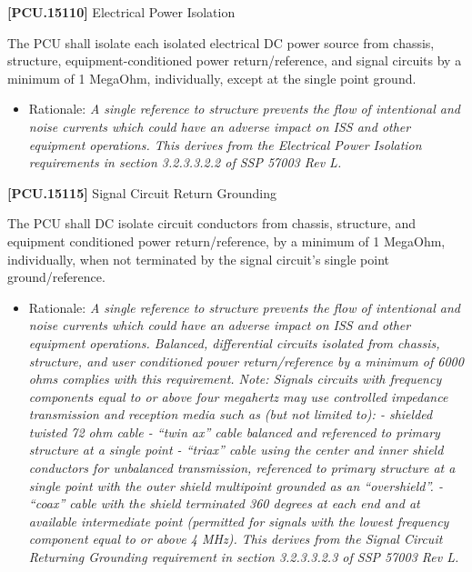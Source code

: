 \textbf{[PCU.15110]} Electrical Power Isolation

The \gls{PCU} shall isolate each isolated electrical DC power source from chassis, structure, equipment-conditioned power return\slash reference, and signal circuits by a minimum of 1 MegaOhm, individually, except at the single point ground.

\begin{itemize}
\item{} Rationale: \emph{A single reference to structure prevents the flow of intentional and noise currents which could have an adverse impact on ISS and other equipment operations. This derives from the Electrical Power Isolation requirements in section 3.2.3.3.2.2 of SSP 57003 Rev L.}

\end{itemize}

\textbf{[PCU.15115]} Signal Circuit Return Grounding

The \gls{PCU} shall DC isolate circuit conductors from chassis, structure, and equipment conditioned power return\slash reference, by a minimum of 1 MegaOhm, individually, when not terminated by the signal circuit's single point ground\slash reference.

\begin{itemize}
\item{} Rationale: \emph{A single reference to structure prevents the flow of intentional and noise currents which could have an adverse impact on ISS and other equipment operations. Balanced, differential circuits isolated from chassis, structure, and user conditioned power return\slash reference by a minimum of 6000 ohms complies with this requirement. Note: Signals circuits with frequency components equal to or above four megahertz may use controlled impedance transmission and reception media such as (but not limited to): - shielded twisted 72 ohm cable - ``twin ax'' cable balanced and referenced to primary structure at a single point - ``triax'' cable using the center and inner shield conductors for unbalanced transmission, referenced to primary structure at a single point with the outer shield multipoint grounded as an ``overshield''. - ``coax'' cable with the shield terminated 360 degrees at each end and at available intermediate point (permitted for signals with the lowest frequency component equal to or above 4 MHz). This derives from the Signal Circuit Returning Grounding requirement in section 3.2.3.3.2.3 of SSP 57003 Rev L.}

\end{itemize}

